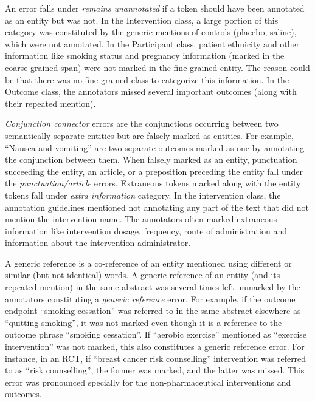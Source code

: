 \documentclass[10.7pt,]{article}
\begin{document}
An error falls under \textit{remains unannotated} if a token should have been annotated as an entity but was not.
In the Intervention class, a large portion of this category was constituted by the generic mentions of controls (placebo, saline), which were not annotated.
In the Participant class, patient ethnicity and other information like smoking status and pregnancy information (marked in the coarse-grained span) were not marked in the fine-grained entity.
The reason could be that there was no fine-grained class to categorize this information. 
In the Outcome class, the annotators missed several important outcomes (along with their repeated mention).

\textit{Conjunction connector} errors are the conjunctions occurring between two semantically separate entities but are falsely marked as entities.
For example, ``Nausea and vomiting'' are two separate outcomes marked as one by annotating the conjunction between them.
When falsely marked as an entity, punctuation succeeding the entity, an article, or a preposition preceding the entity fall under the \textit{punctuation/article} errors.
Extraneous tokens marked along with the entity tokens fall under \textit{extra information} category.
In the intervention class, the annotation guidelines mentioned not annotating any part of the text that did not mention the intervention name.
The annotators often marked extraneous information like intervention dosage, frequency, route of administration and information about the intervention administrator.


A generic reference is a co-reference of an entity mentioned using different or similar (but not identical) words. 
A generic reference of an entity (and its repeated mention) in the same abstract was several times left unmarked by the annotators constituting a \textit{generic reference} error.
For example, if the outcome endpoint ``smoking cessation'' was referred to in the same abstract elsewhere as ``quitting smoking'', it was not marked even though it is a reference to the outcome phrase ``smoking cessation''.
If ``aerobic exercise'' mentioned as ``exercise intervention'' was not marked, this also constitutes a generic reference error.
For instance, in an RCT, if ``breast cancer risk counselling'' intervention was referred to as ``risk counselling'', the former was marked, and the latter was missed.
This error was pronounced specially for the non-pharmaceutical interventions and outcomes.
\end{document}

